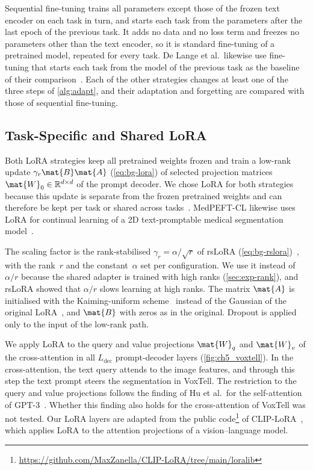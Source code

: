 Sequential fine-tuning trains all parameters except those of the frozen text encoder on each task in turn, and starts each task from the parameters after the last epoch of the previous task.
It adds no data and no loss term and freezes no parameters other than the text encoder, so it is standard fine-tuning of a pretrained model, repeated for every task.
De Lange et al.\ likewise use fine-tuning that starts each task from the model of the previous task as the baseline of their comparison~\cite[Sec.~5]{delange2022}.
Each of the other strategies changes at least one of the three steps of \cref{alg:adapt}, and their adaptation and forgetting are compared with those of sequential fine-tuning.

\subsection{Task-Specific and Shared LoRA}
\label{subsec:method-lora}

Both LoRA strategies keep all pretrained weights frozen and train a low-rank update $\gamma_r\mat{B}\mat{A}$ (\cref{eq:bg-lora}) of selected projection matrices $\mat{W}_0 \in \mathbb{R}^{d \times d}$ of the prompt decoder.
We chose LoRA for both strategies because this update is separate from the frozen pretrained weights and can therefore be kept per task or shared across tasks~\cite[Sec.~4.1]{hu2022lora}.
MedPEFT-CL likewise uses LoRA for continual learning of a 2D text-promptable medical segmentation model~\cite{gao2026medpeftcl}.

The scaling factor is the rank-stabilised $\gamma_r = \alpha / \sqrt{r}$ of rsLoRA (\cref{eq:bg-rslora})~\cite{kalajdzievski2023rankstabilizationscalingfactor}, with the rank~$r$ and the constant~$\alpha$ set per configuration.
We use it instead of $\alpha / r$ because the shared adapter is trained with high ranks (\cref{sec:exp-rank}), and rsLoRA showed that $\alpha / r$ slows learning at high ranks.
The matrix $\mat{A}$ is initialised with the Kaiming-uniform scheme~\cite{he2015delving} instead of the Gaussian of the original LoRA~\cite[Sec.~4.1]{hu2022lora}, and $\mat{B}$ with zeros as in the original.
Dropout is applied only to the input of the low-rank path.

We apply LoRA to the query and value projections $\mat{W}_q$ and $\mat{W}_v$ of the cross-attention in all $L_{\mathrm{dec}}$ prompt-decoder layers (\cref{fig:ch5_voxtell}).
In the cross-attention, the text query attends to the image features, and through this step the text prompt steers the segmentation in VoxTell.
The restriction to the query and value projections follows the finding of Hu et al.\ for the self-attention of GPT-3~\cite[Sec.~7.1, Table~5]{hu2022lora}.
Whether this finding also holds for the cross-attention of VoxTell was not tested.
Our LoRA layers are adapted from the public code\footnote{\url{https://github.com/MaxZanella/CLIP-LoRA/tree/main/loralib}} of CLIP-LoRA~\cite{zanella2024lowrankfewshotadaptationvisionlanguage}, which applies LoRA to the attention projections of a vision--language model.

